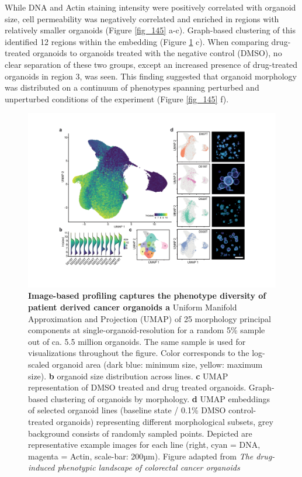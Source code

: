 \begin{flushleft}
\bigbreak
While DNA and Actin staining intensity were positively correlated with organoid size, cell permeability was negatively correlated and enriched in regions with relatively smaller organoids (Figure \ref{fig_145} a-c). Graph-based clustering of this identified 12 regions within the embedding (Figure \ref{fig_140} c). When comparing drug-treated organoids to organoids treated with the negative control (DMSO), no clear separation of these two groups, except an increased presence of drug-treated organoids in region 3,  was seen. This finding suggested that organoid morphology was distributed on a continuum of phenotypes spanning perturbed and unperturbed conditions of the experiment (Figure \ref{fig_145} f). 

\clearpage

\begin{figure}[h]
\centering
\includegraphics[width=\textwidth,
                height=\textheight,
                keepaspectratio]{figures/promise/pdf/fig_1_4.pdf}
\caption[Image-based profiling captures the phenotype diversity of patient derived cancer organoids]{\textbf{Image-based profiling captures the phenotype diversity of patient derived cancer organoids a} Uniform Manifold Approximation and Projection (UMAP) of 25 morphology principal components at single-organoid-resolution for a random 5\% sample out of ca. 5.5 million organoids. The same sample is used for visualizations throughout the figure. Color corresponds to the log-scaled organoid area (dark blue: minimum size, yellow: maximum size). \textbf{b} organoid size distribution across lines. \textbf{c} UMAP representation of DMSO treated and drug treated organoids. Graph-based clustering of organoids by morphology. \textbf{d} UMAP embeddings of selected organoid lines (baseline state / 0.1\% DMSO control-treated organoids) representing different morphological subsets, grey background consists of randomly sampled points. Depicted are representative example images for each line (right, cyan = DNA, magenta = Actin, scale-bar: 200µm). Figure adapted from \textit{The drug-induced phenotypic landscape of colorectal cancer organoids} \parencite{betgeDruginducedPhenotypicLandscape2022}}
\label{fig_140}
\end{figure}
\bigbreak


\end{flushleft}
